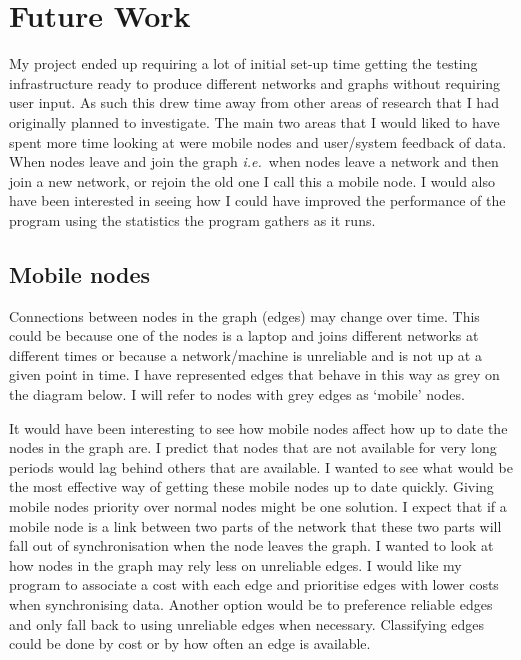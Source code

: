 \documentclass[12pt]{article}
\begin{document}
\newpage
\section{Future Work}
My project ended up requiring a lot of initial set-up
time getting the testing infrastructure ready to
produce different networks and graphs without requiring
user input. As such this drew time away from other
areas of research that I had originally planned to
investigate. The main two areas that I would liked
to have spent more time looking at were mobile nodes
and user/system feedback of data.
When nodes leave and join the graph \emph{i.e.}\ when
nodes leave a network and then join a new network, or
rejoin the old one I call this a mobile node.
I would also have been interested
in seeing how I could have improved the performance
of the program using the statistics the program
gathers as it runs.

\subsection{Mobile nodes}
\label{sec:mobile}
Connections between nodes in the graph (edges) may
change over time. This could be because one of the nodes
is a laptop and joins different networks at different
times or because a network/machine is unreliable and is
not up at a given point in time. I have represented
edges that behave in this way as grey on the diagram below.
I will refer to nodes with grey edges as `mobile' nodes.

It would have been interesting to see how mobile nodes affect how
up to date the nodes in the graph are. I predict that
nodes that are not available for very long periods would lag behind
others that are available. I wanted to see what would be
the most effective way of getting these mobile nodes
up to date quickly. Giving mobile nodes priority over
normal nodes might be one solution.
I expect that if a mobile
node is a link between two parts of the network that
these two parts will fall out of synchronisation when the node
leaves the graph. I wanted to look
at how nodes in the graph may 
rely less on unreliable edges. I would like my program
to associate a cost with each edge and prioritise edges
with lower costs when synchronising data. Another option
would be to preference reliable edges and only fall back to using
unreliable edges when necessary. Classifying edges could be
done by cost or by how often an edge is available.
\end{document}
